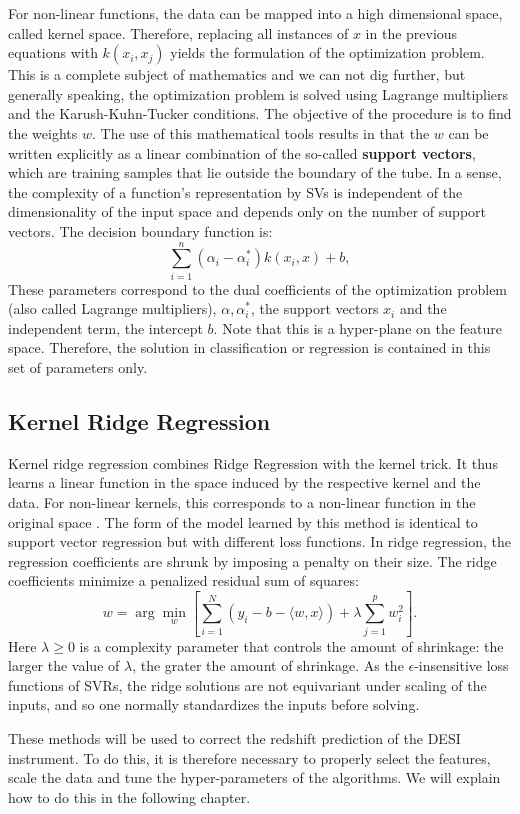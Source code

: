 For non-linear functions, the data can be mapped into a high dimensional space, called kernel space. Therefore, replacing all instances of $x$ in the previous equations with $k(x_i, x_j)$ yields the formulation of the optimization problem. This is a complete subject of mathematics and we can not dig further, but generally speaking, the optimization problem is solved using Lagrange multipliers and the Karush-Kuhn-Tucker conditions. The objective of the procedure is to find the weights $w$. The use of this mathematical tools results in that the $w$ can be written explicitly as a linear combination of the so-called \textbf{support vectors}, which are training samples that lie outside the boundary of the tube. In a sense, the complexity of a function's representation by SVs is independent of the dimensionality of the input space and depends only on the number of support vectors\cite{Hofmann2008}. The decision boundary function is:
\begin{equation}
\sum_{i = 1}^{n} (\alpha_i - \alpha_{i}^{*})k(x_i, x) + b,
\end{equation}
These parameters correspond to the dual coefficients of the optimization problem (also called Lagrange multipliers), $\alpha, \alpha_{i}^{*}$, the support vectors $x_i$ and the independent term, the intercept $b$. Note that this is a hyper-plane on the feature space. Therefore, the solution in classification or regression is contained in this set of parameters only. 
\subsection{Kernel Ridge Regression}
Kernel ridge regression combines Ridge Regression with the kernel trick. It thus learns a linear function in the space induced by the respective kernel and the data. For non-linear kernels, this corresponds to a non-linear function in the original space \cite{krr}. The form of the model learned by this method is identical to support vector regression but with different loss functions. In ridge regression, the regression coefficients are shrunk by imposing a penalty on their size. The ridge coefficients minimize a penalized residual sum of squares:
\begin{equation}
w = \arg \min_{w} \left[ \sum_{i = 1}^{N}(y_i - b - \langle w, x\rangle) + \lambda \sum_{j = 1}^{p} w_{i}^{2}\right].
\end{equation}
Here $\lambda \geq 0$ is a complexity parameter that controls the amount of shrinkage: the larger the value of $\lambda$, the grater the amount of shrinkage. As the $\epsilon$-insensitive loss functions of SVRs, the ridge solutions are not equivariant under scaling of the inputs, and so one normally standardizes the inputs before solving. 

These methods will be used to correct the redshift prediction of the DESI instrument. To do this, it is therefore necessary to properly select the features, scale the data and tune the hyper-parameters of the algorithms. We will explain how to do this in the following chapter. 